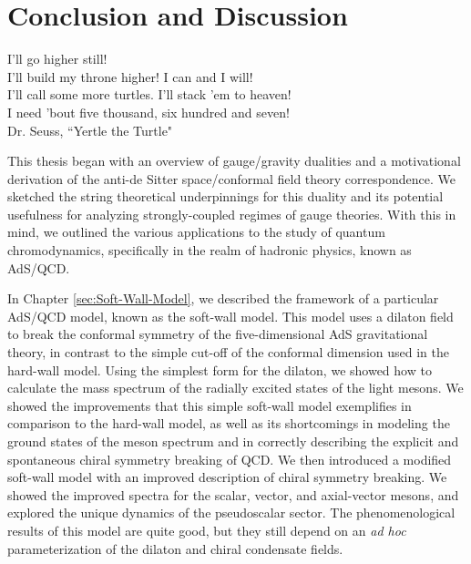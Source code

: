 \chapter{Conclusion and Discussion}
\label{conclusion_chapter}

\begin{flushright}
I'll go higher still!\\
I'll build my throne higher! I can and I will!\\
I'll call some more turtles.  I'll stack 'em to heaven!\\
I need 'bout five thousand, six hundred and seven!\\
Dr. Seuss, ``Yertle the Turtle"
\end{flushright}

This thesis began with an overview of gauge/gravity dualities and a motivational derivation of the anti-de Sitter space/conformal field theory correspondence.
We sketched the string theoretical underpinnings for this duality and its potential usefulness for analyzing strongly-coupled regimes of gauge theories.
With this in mind, we outlined the various applications to the study of quantum chromodynamics, specifically in the realm of hadronic physics, known as AdS/QCD.

In Chapter \ref{sec:Soft-Wall-Model}, we described the framework of a particular AdS/QCD model, known as the soft-wall model. 
This model uses a dilaton field to break the conformal symmetry of the five-dimensional AdS gravitational theory, in contrast to the simple cut-off of the conformal dimension used in the hard-wall model.
Using the simplest form for the dilaton, we showed how to calculate the mass spectrum of the radially excited states of the light mesons.
We showed the improvements that this simple soft-wall model exemplifies in comparison to the hard-wall model, as well as its shortcomings in modeling the ground states of the meson spectrum and in correctly describing the explicit and spontaneous chiral symmetry breaking of QCD.
We then introduced a modified soft-wall model with an improved description of chiral symmetry breaking.
We showed the improved spectra for the scalar, vector, and axial-vector mesons, and explored the unique dynamics of the pseudoscalar sector.
The phenomenological results of this model are quite good, but they still depend on an \emph{ad hoc} parameterization of the dilaton and chiral condensate fields.

